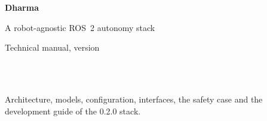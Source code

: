 \documentclass[11pt,a4paper,oneside]{report}
\begin{document}
\begin{titlepage}
  \centering
  \vspace*{3cm}
  {\sffamily\bfseries\Huge Dharma\par}
  \vspace{0.6cm}
  {\sffamily\Large A robot-agnostic ROS~2 autonomy stack\par}
  \vspace{0.3cm}
  {\sffamily\large Technical manual, version \DharmaVersion\par}
  \vspace{2.5cm}
  {\large \DharmaAuthor\par}
  \vspace{0.3cm}
  {\small \DharmaAffilOne\\ \DharmaAffilTwo\\ \DharmaEmail\par}
  \vfill
  {\small Architecture, models, configuration, interfaces, the safety case and the development
  guide of the 0.2.0 stack.\par}
\end{titlepage}

\tableofcontents















\appendix




\end{document}
